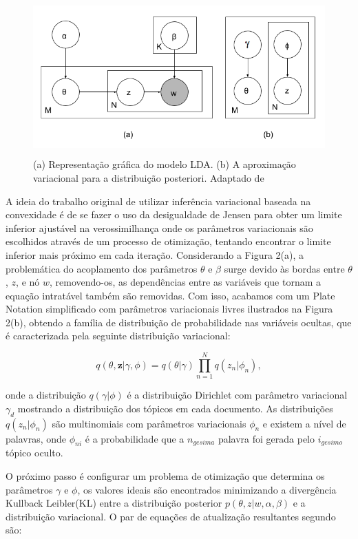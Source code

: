 \documentclass[12pt,a4paper]{article}
\begin{document}
  
  \begin{figure}[H]
    \centering
      \includegraphics[height=6cm]{images/figure_2.png}
      \caption{(a) Representação gráfica do modelo LDA. (b) A aproximação variacional para a distribuição posteriori. Adaptado de }
  \end{figure}
  
  A ideia do trabalho original de utilizar inferência variacional baseada na convexidade é de se fazer o uso da desigualdade de Jensen para obter um limite inferior ajustável na verossimilhança \cite{jordan1999introduction} onde os parâmetros variacionais são escolhidos através de um processo de otimização,
   tentando encontrar o limite inferior mais próximo em cada iteração. Considerando a Figura 2(a), a problemática do acoplamento dos parâmetros $\theta$ e $\beta$ surge devido às bordas entre $\theta$, $z$,
   e nó $w$, removendo-os, as dependências entre as variáveis que tornam a equação intratável também são removidas. Com isso,
   acabamos com um Plate Notation simplificado com parâmetros variacionais livres ilustrados na Figura 2(b), obtendo a família de distribuição de probabilidade nas variáveis ocultas,
   que é caracterizada pela seguinte distribuição variacional:
  
  \begin{equation}
  q(\theta,\textbf{z}|\gamma,\phi)=q(\theta|\gamma)\prod_{n=1}^{N}q(z_n|\phi_n), 
  \end{equation}
  
  onde a distribuição  $q(\gamma|\phi)$ é a distribuição Dirichlet com parâmetro variacional $\gamma_d$ mostrando a distribuição dos tópicos em cada documento.
   As distribuições $q(z_n | \phi_n)$ são multinomiais com parâmetros variacionais $\phi_n$ e existem a nível de palavras, onde $\phi_{ni}$ é a probabilidade que a $n_{gesima}$ palavra foi gerada pelo $i_{gesimo}$ tópico oculto.
  
  O próximo passo é configurar um problema de otimização que determina os parâmetros $\gamma$ e $\phi$,
   os valores ideais são encontrados minimizando a divergência Kullback Leibler(KL) entre a distribuição posterior $p(\theta, z|w,\alpha,\beta)$ e a distribuição variacional.
   O par de equações de atualização resultantes segundo  são:
  
\end{document}

